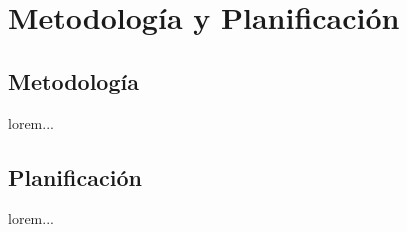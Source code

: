 
\chapter{Metodología y Planificación}

  \section{Metodología}

lorem...


  \section{Planificación}

lorem...

